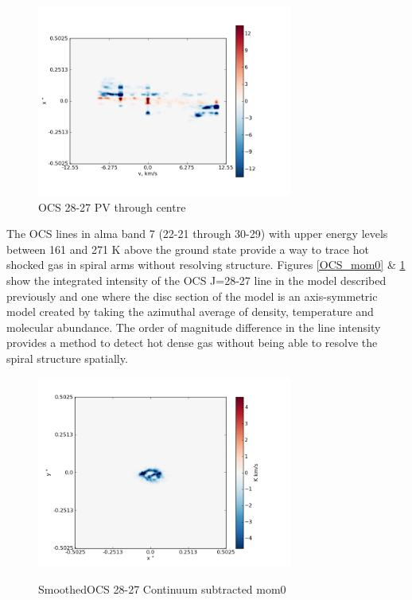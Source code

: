 \documentclass[useAMS,usenatbib]{mn2e}
\begin{document}
\begin{figure}[H]
 \includegraphics[width=84mm]{Figures/sim/imageOCS_28-27_30deg_composite_PV_centre.png}

 \caption{OCS 28-27 PV through centre}
\end{figure}

The OCS lines in alma band 7 (22-21 through 30-29) with upper energy levels between 161 and 271 K above the ground state provide a way to trace hot shocked gas in spiral arms without resolving structure. Figures \ref{OCS_mom0} \& \ref{smoothOCS_mom0} show the integrated intensity of the OCS J=28-27 line in the model described previously and one where the disc section of the model is an axis-symmetric model created by taking the azimuthal average of density, temperature and molecular abundance. The order of magnitude difference in the line intensity provides a method to detect hot dense gas without being able to resolve the spiral structure spatially.\newline

\begin{figure}
 \includegraphics[width=84mm]{Figures/sim/imagesmoothedOCS_28-27_30deg_contSub.png}
 \label{smoothOCS_mom0}
 \caption{SmoothedOCS 28-27 Continuum subtracted mom0}
\end{figure}
\end{document}
